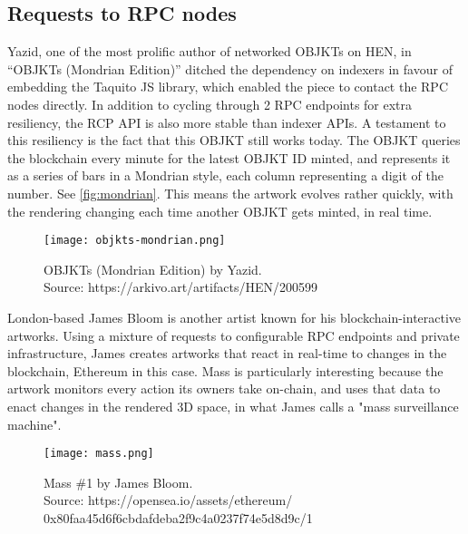 \subsection{Requests to RPC nodes}

Yazid, one of the most prolific author of networked OBJKTs on HEN, in ``OBJKTs (Mondrian Edition)'' ditched the dependency on indexers in favour of embedding the Taquito JS library, which enabled the piece to contact the RPC nodes directly. In addition to cycling through 2 RPC endpoints for extra resiliency, the RCP API is also more stable than indexer APIs. A testament to this resiliency is the fact that this OBJKT still works today. The OBJKT queries the blockchain every minute for the latest OBJKT ID minted, and represents it as a series of bars in a Mondrian style, each column representing a digit of the number. See \autoref{fig:mondrian}. This means the artwork evolves rather quickly, with the rendering changing each time another OBJKT gets minted, in real time.

\begin{figure}[h]
    \centering
    \captionsetup{justification=centering}
    \texttt{[image: objkts-mondrian.png]}
    \captionsetup{justification=centering}
    \caption[OBJKTs (Mondrian Edition) by Yazid]{OBJKTs (Mondrian Edition) by Yazid. \\ Source: https://arkivo.art/artifacts/HEN/200599}
    \label{fig:mondrian}
\end{figure}

London-based James Bloom is another artist known for his blockchain-interactive artworks. Using a mixture of requests to configurable RPC endpoints and private infrastructure, James creates artworks that react in real-time to changes in the blockchain, Ethereum in this case. Mass is particularly interesting because the artwork monitors every action its owners take on-chain, and uses that data to enact changes in the rendered 3D space, in what James calls a "mass surveillance machine".

\begin{figure}[h]
    \centering
    \captionsetup{justification=centering}
    \texttt{[image: mass.png]}
    \captionsetup{justification=centering}
    \caption[Mass \#1 by James Bloom]{Mass \#1 by James Bloom. \\ Source: https://opensea.io/assets/ethereum/ \\
    0x80faa45d6f6cbdafdeba2f9c4a0237f74e5d8d9c/1}
    \label{fig:mass}
\end{figure}


